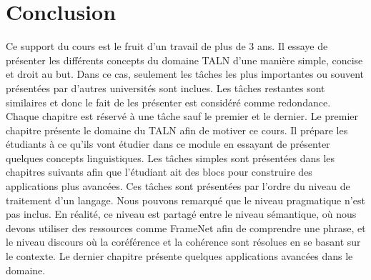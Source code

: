 \documentclass{KodeBook}
\begin{document}
		\mainmatter
	
\fi

\chapter*{Conclusion}



Ce support du cours est le fruit d'un travail de plus de 3 ans. 
Il essaye de présenter les différents concepts du domaine TALN d'une manière simple, concise et droit au but.
Dans ce cas, seulement les tâches les plus importantes ou souvent présentées par d'autres universités sont inclues.
Les tâches restantes sont similaires et donc le fait de les présenter est considéré comme redondance.
Chaque chapitre est réservé à une tâche sauf le premier et le dernier.
Le premier chapitre présente le domaine du TALN afin de motiver ce cours. 
Il prépare les étudiants à ce qu'ils vont étudier dans ce module en essayant de présenter quelques concepts linguistiques.
Les tâches simples sont présentées dans les chapitres suivants afin que l'étudiant ait des blocs pour construire des applications plus avancées.
Ces tâches sont présentées par l'ordre du niveau de traitement d'un langage.
Nous pouvons remarqué que le niveau pragmatique n'est pas inclus.
En réalité, ce niveau est partagé entre le niveau sémantique, où nous devons utiliser des ressources comme FrameNet afin de comprendre une phrase, et le niveau discours où la coréférence et la cohérence sont résolues en se basant sur le contexte.
Le dernier chapitre présente quelques applications avancées dans le domaine.
\end{document}
